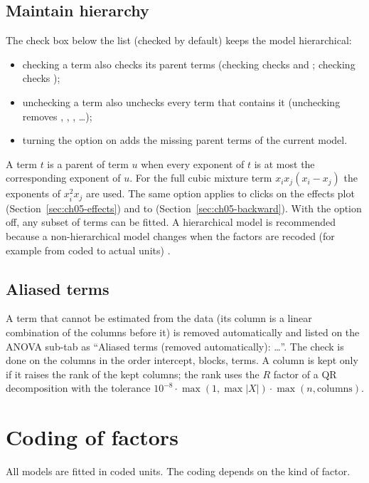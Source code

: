 \subsection*{Maintain hierarchy}
The check box  below the list (checked by default) keeps the model hierarchical:
\begin{itemize}
  \item checking a term also checks its parent terms (checking  checks  and ;
        checking  checks );
  \item unchecking a term also unchecks every term that contains it (unchecking  removes ,
        , , \dots);
  \item turning the option on adds the missing parent terms of the current model.
\end{itemize}
A term $t$ is a parent of term $u$ when every exponent of $t$ is at most the corresponding exponent of $u$.
For the full cubic mixture term $x_ix_j(x_i-x_j)$ the exponents of $x_i^2x_j$ are used. The same option
applies to clicks on the effects plot (Section~\ref{sec:ch05-effects}) and to 
(Section~\ref{sec:ch05-backward}). With the option off, any subset of
terms can be fitted. A hierarchical model is recommended because a non-hierarchical model changes when the
factors are recoded (for example from coded to actual units) \citep{montgomery2017,myers2016}.

\subsection*{Aliased terms}
A term that cannot be estimated from the data (its column is a linear combination of the columns before
it) is removed automatically and listed on the ANOVA sub-tab as ``Aliased terms (removed automatically):
\dots''. The check is done on the columns in the order intercept, blocks, terms. A column is kept only if
it raises the rank of the kept columns; the rank uses the $R$ factor of a QR decomposition with the
tolerance $10^{-8}\cdot\max(1,\max|X|)\cdot\max(n,\text{columns})$.

\section{Coding of factors}\label{sec:ch05-coding}

All models are fitted in coded units. The coding depends on the kind of factor.

